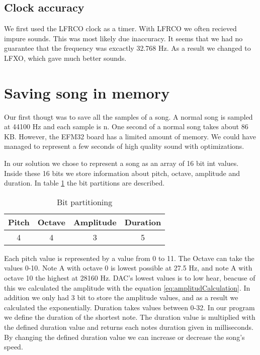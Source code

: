 \subsection{Clock accuracy}
We first used the LFRCO clock as a timer. With LFRCO we often recieved impure sounds. This was most likely due inaccuracy. It seems that we had no guarantee that the frequency was excactly 32.768 Hz. As a result we changed to LFXO, which gave much better sounds.

\section{Saving song in memory}
Our first thougt was to save all the samples of a song. A normal song is sampled at 44100 Hz and each sample is n. One second of a normal song takes about 86 KB. However, the EFM32 board has a limited amount of memory. We could have managed to represent a few seconds of high quality sound with optimizations. 

In our solution we chose to represent a song as an array of 16 bit int values. Inside these 16 bits we store information about pitch, octave, amplitude and duration. In table \ref{tab:bitFields} the bit partitions are described. \\

\begin{table}[ht]
	\begin{center}
	\begin{tabular}{ |c|c|c|c| }
	  \hline
	  Pitch & Octave & Amplitude & Duration \\
	  \hline
	  4 & 4 & 3 & 5 \\
	  \hline

	\end{tabular}
	\caption{Bit partitioning}
	\label{tab:bitFields}
	\end{center}
\end{table}

Each pitch value is represented by a value from 0 to 11. The Octave can take the values 0-10. Note A with octave 0 is lowest possible at 27.5 Hz, and note A with octave 10 the highest at 28160 Hz. DAC's lowest values is to low hear, beacuse of this we calculated the amplitude with the equation \ref{eq:amplitudCalculation}. In addition we only had 3 bit to store the amplitude values, and as a result we calculated the exponentially. Duration takes values between 0-32. In our program we define the duration of the shortest note. The duration value is multiplied with the defined duration value and returns each notes duration given in milliseconds. By changing the defined duration value we can increase or decrease the song's speed.

